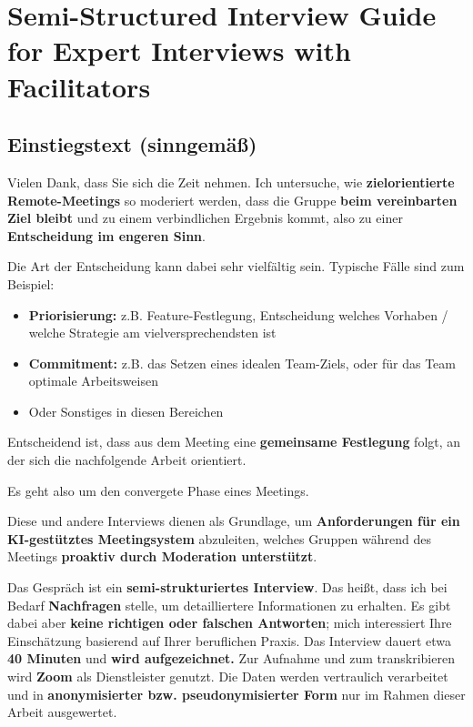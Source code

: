 \section{Semi-Structured Interview Guide for Expert Interviews with Facilitators}
\label{annex:interview-guide-facilitators}

\subsection*{Einstiegstext (sinngemäß)}

Vielen Dank, dass Sie sich die Zeit nehmen. Ich untersuche, wie \textbf{zielorientierte Remote-Meetings}
so moderiert werden, dass die Gruppe \textbf{beim vereinbarten Ziel bleibt} und zu einem
verbindlichen Ergebnis kommt, also zu einer \textbf{Entscheidung im engeren Sinn}.

Die Art der Entscheidung kann dabei sehr vielfältig sein. Typische Fälle sind zum Beispiel:
\begin{itemize}
  \item \textbf{Priorisierung:} z.B. Feature-Festlegung, Entscheidung welches Vorhaben / welche Strategie am
    vielversprechendsten ist
  \item \textbf{Commitment:} z.B. das Setzen eines idealen Team-Ziels, oder für das Team optimale Arbeitsweisen
  \item Oder Sonstiges in diesen Bereichen
\end{itemize}
Entscheidend ist, dass aus dem Meeting eine \textbf{gemeinsame Festlegung} folgt, an der sich die
nachfolgende Arbeit orientiert.

Es geht also um den convergete Phase eines Meetings.

Diese und andere Interviews dienen als Grundlage, um \textbf{Anforderungen für ein KI-gestütztes Meetingsystem}
abzuleiten, welches Gruppen während des Meetings \textbf{proaktiv durch Moderation unterstützt}.

Das Gespräch ist ein \textbf{semi-strukturiertes Interview}. Das heißt, dass ich bei Bedarf \textbf{Nachfragen}
stelle, um detailliertere Informationen zu erhalten.
Es gibt dabei aber \textbf{keine richtigen oder falschen Antworten}; mich interessiert Ihre Einschätzung basierend auf
Ihrer beruflichen Praxis.
Das Interview dauert etwa \textbf{40 Minuten} und \textbf{wird aufgezeichnet.} Zur Aufnahme und zum
transkribieren wird \textbf{Zoom} als Dienstleister genutzt. Die Daten werden vertraulich verarbeitet und in
\textbf{anonymisierter bzw. pseudonymisierter Form} nur im Rahmen dieser Arbeit ausgewertet.

